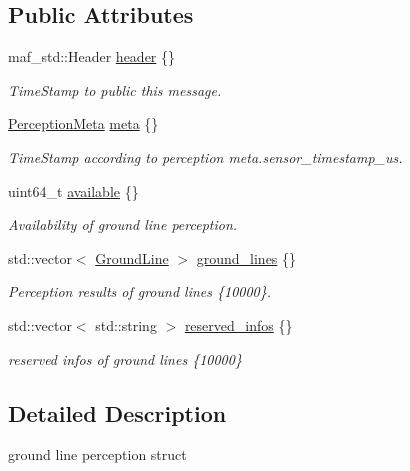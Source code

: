 \subsection*{Public Attributes}
\begin{DoxyCompactItemize}
\item 
maf\+\_\+std\+::\+Header \hyperlink{structmaf__perception__interface_1_1GroundLinePerception_a779b28609782a27dc3802d350a4d17cd}{header} \{\}
\begin{DoxyCompactList}\small\item\em Time\+Stamp to public this message. \end{DoxyCompactList}\item 
\hyperlink{structmaf__perception__interface_1_1PerceptionMeta}{Perception\+Meta} \hyperlink{structmaf__perception__interface_1_1GroundLinePerception_ac97f8734f24cc50e5025731a3e0c320f}{meta} \{\}
\begin{DoxyCompactList}\small\item\em Time\+Stamp according to perception meta.\+sensor\+\_\+timestamp\+\_\+us. \end{DoxyCompactList}\item 
uint64\+\_\+t \hyperlink{structmaf__perception__interface_1_1GroundLinePerception_a5a206d53b000bfe78cf04466ef373567}{available} \{\}
\begin{DoxyCompactList}\small\item\em Availability of ground line perception. \end{DoxyCompactList}\item 
std\+::vector$<$ \hyperlink{structmaf__perception__interface_1_1GroundLine}{Ground\+Line} $>$ \hyperlink{structmaf__perception__interface_1_1GroundLinePerception_acd7c76a21de361cf69791c604e2beaa1}{ground\+\_\+lines} \{\}
\begin{DoxyCompactList}\small\item\em Perception results of ground lines \{10000\}. \end{DoxyCompactList}\item 
std\+::vector$<$ std\+::string $>$ \hyperlink{structmaf__perception__interface_1_1GroundLinePerception_a60d118ccc3db6add394082a6bae2a77c}{reserved\+\_\+infos} \{\}
\begin{DoxyCompactList}\small\item\em reserved infos of ground lines \{10000\} \end{DoxyCompactList}\end{DoxyCompactItemize}


\subsection{Detailed Description}
ground line perception struct 

